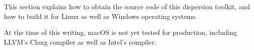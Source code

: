 %
This section explains how to obtain the source code of this dispersion toolkit, and how to build it for Linux as well as Windows operating systems. 

At the time of this writing, macOS is not yet tested for production, including LLVM's Clang compiler as well as Intel's compiler.
